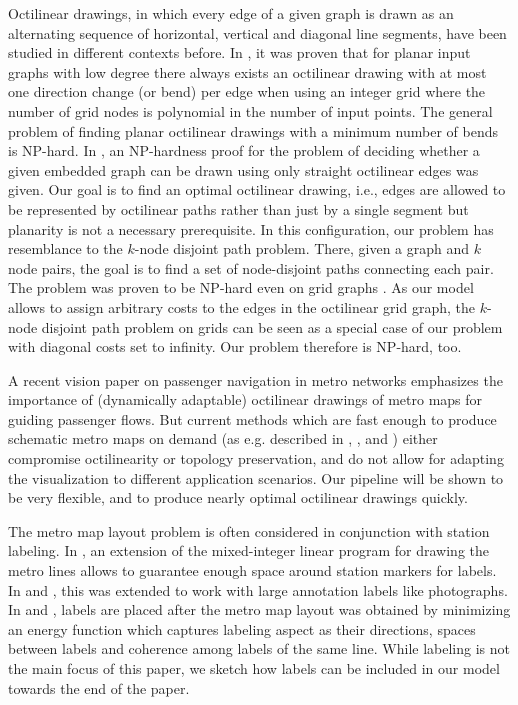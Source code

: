 \documentclass[sigconf]{acmart}
\begin{document}
Octilinear drawings, in which every edge of a given graph is drawn as an alternating sequence of horizontal, vertical and diagonal line segments, have been studied in different contexts before. In \cite{bekos2014planar}, it was proven that for planar input graphs with low degree there always exists an octilinear drawing with at most one direction change (or bend) per edge when using an integer grid where the number of grid nodes is polynomial in the number of input points. The general problem of finding planar octilinear drawings with a minimum number of bends is NP-hard. In \cite{nollenburg2005automated}, an NP-hardness proof for the problem of deciding whether a given embedded graph can be drawn using only straight octilinear edges was given. Our goal is to find an optimal octilinear drawing, i.e., edges are allowed to be represented by octilinear paths rather than just by a single segment but planarity is not a necessary prerequisite. In this configuration, our problem has resemblance to the $k$-node disjoint path problem. There, given a graph and $k$ node pairs, the goal is to find a set of  node-disjoint paths connecting each pair. The problem was proven to be NP-hard even on grid graphs \cite{chuzhoy2015approximating}. As our model allows to assign arbitrary costs to the edges in the octilinear grid graph, the $k$-node disjoint path problem on grids can be seen as a special case of our problem with diagonal costs set to infinity. Our problem therefore is NP-hard, too.

A recent vision paper on passenger navigation in metro networks \cite{craig2019vision} emphasizes the importance of (dynamically adaptable) octilinear drawings of metro maps for guiding passenger flows. But current methods which are fast enough to produce schematic metro maps on demand (as e.g. described in \cite{claudio2014octilinear}, \cite{van2018realtime}, \cite{wang2011} and \cite{wang2016}) either compromise octilinearity or topology preservation, and do not allow for adapting the visualization to different application scenarios. Our pipeline will be shown to be very flexible, and to  produce nearly optimal octilinear drawings quickly.

The metro map layout problem is often considered in conjunction with station labeling. In \cite{noll11}, an extension of the mixed-integer linear program for drawing the metro lines allows to guarantee enough space around station markers for labels. In \cite{WuTLY12} and \cite{WuTHALY13}, this was extended to work with large annotation labels like photographs. In \cite{wang2011} and \cite{wang2016}, labels are placed after the metro map layout was obtained by minimizing an energy function which captures labeling aspect as their directions, spaces between labels and coherence among labels of the same line. While labeling is not the main focus of this paper, we sketch how labels can be included in our model towards the end of the paper.
\end{document}
